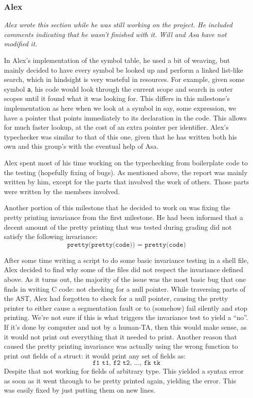 \documentclass{article}
\begin{document}
\subsubsection{Alex}

\textit{Alex wrote this section while he was still working on the project. He
  included comments indicating that he wasn't finished with it. Will and Asa
  have not modified it.}


In Alex's implementation of the symbol table, he used a bit of weaving, but
mainly decided to have every symbol be looked up and perform a linked list-like
search, which in hindsight is very wasteful in resources. For example,
given some symbol \verb$a$, his code would look through the current scope and
search in outer scopes until it found what it was looking for. This differs
in this milestone's implementation as here when we look at a symbol in say, some
expression, we have a pointer that points immediately to its declaration in
the code. This allows for much faster lookup, at the cost of an extra pointer
per identifier. Alex's typechecker was similar to that of this one, given
that he has written both his own and this group's with the eventual help of
Asa.

Alex spent most of his time working on the typechecking from boilerplate code
to the testing (hopefully fixing of bugs). As mentioned above, the report was
mainly written by him, except for the parts that involved the work of others.
Those parts were written by the members involved.

Another portion of this milestone that he decided to work on was fixing the pretty printing invariance from the first milestone.
He had been informed that a decent amount of the pretty printing that was tested during grading did not satisfy the following invariance:
\[
    \texttt{pretty(pretty(code)) = pretty(code)}
\]

After some time writing a script to do some basic invariance testing in a shell
file, Alex decided to find why some of the files did not respect the
invariance defined above. As it turns out, the majority of the issue was the
most basic bug that one finds in writing C code: not checking for a null pointer.
While traversing parts of the AST, Alex had forgotten to check for a null
pointer, causing the pretty printer to either cause a segmentation fault or to
(somehow) fail silently and stop printing. We're not sure if this is what
triggers the invariance test to yield a ``no''. If it's done by computer and
not by a human-TA, then this would make sense, as it would not print out everything that it needed to print. Another reason that caused the pretty
printing invariance was actually using the wrong function to print out fields
of a struct: it would print any set of fields as:
\[
    \texttt{f1 t1, f2 t2, ..., fk tk}
\]
Despite that not working for fields of arbitrary type. This yielded a syntax error as
soon as it went through to be pretty printed again, yielding the error. This was easily fixed by just putting them on new lines.
\end{document}
